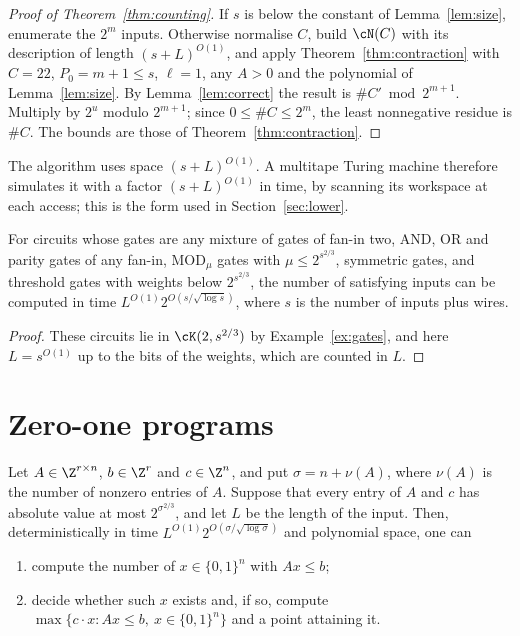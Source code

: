 \begin{proof}[Proof of Theorem~\ref{thm:counting}]
If $s$ is below the constant of Lemma~\ref{lem:size}, enumerate the $2^m$ inputs.
Otherwise normalise $C$, build $\cN(C)$ with its description of length
$(s+L)^{O(1)}$, and apply Theorem~\ref{thm:contraction} with $C=22$,
$P_0=m+1\le s$, $\ell=1$, any $A>0$ and the polynomial of Lemma~\ref{lem:size}.
By Lemma~\ref{lem:correct} the result is $\#C'\bmod2^{m+1}$. Multiply by $2^u$
modulo $2^{m+1}$; since $0\le\#C\le2^m$, the least nonnegative residue is $\#C$.
The bounds are those of Theorem~\ref{thm:contraction}.
\end{proof}

\begin{remark}\label{rem:space}
The algorithm uses space $(s+L)^{O(1)}$. A multitape Turing machine therefore
simulates it with a factor $(s+L)^{O(1)}$ in time, by scanning its workspace at
each access; this is the form used in Section~\ref{sec:lower}.
\end{remark}

\begin{corollary}\label{cor:classes}
For circuits whose gates are any mixture of gates of fan-in two, AND, OR and
parity gates of any fan-in, $\mathrm{MOD}_\mu$ gates with $\mu\le2^{s^{2/3}}$,
symmetric gates, and threshold gates with weights below $2^{s^{2/3}}$, the
number of satisfying inputs can be computed in time $L^{O(1)}2^{O(s/\sqrt{\log
s})}$, where $s$ is the number of inputs plus wires.
\end{corollary}

\begin{proof}
These circuits lie in $\cK(2,s^{2/3})$ by Example~\ref{ex:gates}, and here
$L=s^{O(1)}$ up to the bits of the weights, which are counted in $L$.
\end{proof}

\section{Zero-one programs}\label{sec:ilp}

\begin{corollary}[Theorem C]\label{cor:ilp}
Let $A\in\Z^{r\times n}$, $b\in\Z^r$ and $c\in\Z^n$, and put $\sigma=n+\nu(A)$,
where $\nu(A)$ is the number of nonzero entries of $A$. Suppose that every
entry of $A$ and $c$ has absolute value at most $2^{\sigma^{2/3}}$, and let $L$ be
the length of the input. Then, deterministically in time
$L^{O(1)}2^{O(\sigma/\sqrt{\log\sigma})}$ and polynomial space, one can
\begin{enumerate}[label=\textup{(\roman*)},leftmargin=2.2em]
\item compute the number of $x\in\{0,1\}^n$ with $Ax\le b$;
\item decide whether such $x$ exists and, if so, compute $\max\{c\cdot x:Ax\le
b,\ x\in\{0,1\}^n\}$ and a point attaining it.
\end{enumerate}
\end{corollary}

